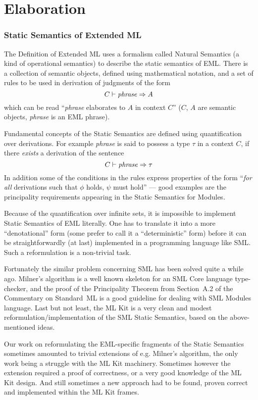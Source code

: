 \part{Elaboration} 
\label{sec:elaboration}

\section{Static Semantics of Extended ML}
\label{sec:static}
   
The Definition of Extended ML uses a formalism called Natural Semantics 
(a kind of operational semantics) to describe the static semantics of EML.
There is a collection of semantic objects, defined using mathematical notation,
and a set of rules to be used in derivation of judgments of the form
\[C\vdash{\it phrase}\Rightarrow A\]
which can be read ``{\it phrase} elaborates to $A$ in context $C$''
($C$, $A$ are semantic objects, {\it phrase} is an EML phrase).

Fundamental concepts of the Static Semantics are defined 
using quantification over derivations. For example
{\it phrase} is said to possess a type $\tau$ in a context $C$, 
if there \emph{exists} a derivation of the sentence
\[C\vdash{\it phrase}\Rightarrow\tau\]
In addition some of the conditions in the rules
express properties of the form ``\emph{for all} derivations
such that $\phi$ holds, $\psi$ must hold'' --- good examples
are the principality requirements appearing in the Static Semantics for Modules.

Because of the quantification over infinite sets,
it is impossible to implement Static Semantics of EML
literally.
One has to translate it into a more ``denotational'' form
(some prefer to call it a ``deterministic'' form)
before it can be straightforwardly (at last)
implemented in a programming language like SML.
Such a reformulation is a non-trivial task.

Fortunately the similar problem concerning SML 
has been solved quite a while ago.
Milner's algorithm \cite{DM82} 
is a well known skeleton for 
an SML Core language type-checker,
and the proof of the Principality Theorem
from Section~A.2 of the Commentary on Standard~ML \cite{MT91}
is a good guideline for dealing with SML Modules language.
Last but not least, the ML Kit is a very clean and modest
reformulation/implementation of the SML Static Semantics,
based on the above-mentioned ideas. 

Our work on reformulating the EML-specific
fragments of the Static Semantics sometimes
amounted to trivial extensions of e.g.
Milner's algorithm, the only work being
a struggle with the ML Kit machinery.
Sometimes however the extension required a proof of correctness,
or a very good knowledge of the ML Kit design.
And still sometimes a new approach had to be found,
proven correct and implemented within the ML Kit frames.

